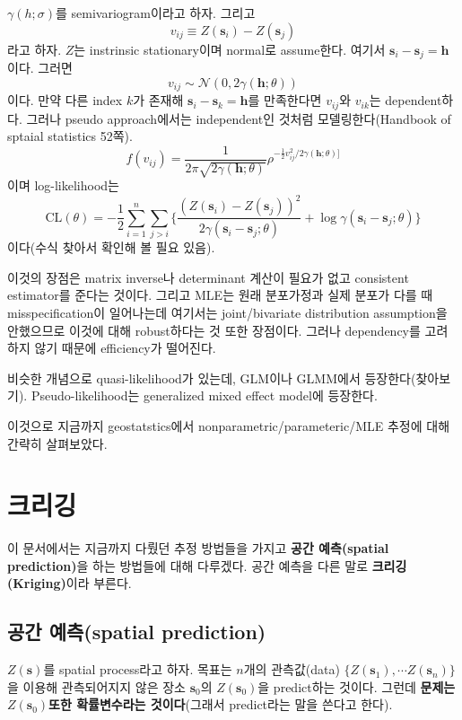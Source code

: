 \documentclass[b5paper,]{scrbook}
\theoremstyle{plain}
\theoremstyle{definition}
\numberwithin{equation}{section}
\begin{document}
\(\gamma(h;\sigma)\)를 semivariogram이라고 하자. 그리고
\[v_{ij}\equiv Z(\mathbf{s}_{i})-Z(\mathbf{s}_{j})\] 라고 하자. \(Z\)는
instrinsic stationary이며 normal로 assume한다. 여기서
\(\mathbf{s}_{i}-\mathbf{s}_{j}=\mathbf{h}\)이다. 그러면
\[v_{ij} \sim \mathcal{N}(0, 2\gamma(\mathbf{h};\theta))\] 이다. 만약
다른 index \(k\)가 존재해 \(\mathbf{s}_{i}-\mathbf{s}_{k}=\mathbf{h}\)를
만족한다면 \(v_{ij}\)와 \(v_{ik}\)는 dependent하다. 그러나 pseudo
approach에서는 independent인 것처럼 모델링한다(Handbook of sptaial
statistics 52쪽).
\[f(v_{ij})=\frac{1}{2\pi\sqrt{2\gamma(\mathbf{h};\theta)}}\rho^{-\frac{1}{2}v_{ij}^{2}/2\gamma(\mathbf{h};\theta)]}\]
이며 log-likelihood는
\[\text{CL}(\theta)=-\frac{1}{2}\sum_{i=1}^{n}\sum_{j>i}\{ \frac{(Z(\mathbf{s}_{i})-Z(\mathbf{s}_{j}))^{2}}{2\gamma(\mathbf{s}_{i}-\mathbf{s}_{j};\theta)}+\log \gamma(\mathbf{s}_{i}-\mathbf{s}_{j};\theta) \}\]
이다(수식 찾아서 확인해 볼 필요 있음).

이것의 장점은 matrix inverse나 determinant 계산이 필요가 없고 consistent
estimator를 준다는 것이다. 그리고 MLE는 원래 분포가정과 실제 분포가 다를
때 misspecification이 일어나는데 여기서는 joint/bivariate distribution
assumption을 안했으므로 이것에 대해 robust하다는 것 또한 장점이다.
그러나 dependency를 고려하지 않기 때문에 efficiency가 떨어진다.

비슷한 개념으로 quasi-likelihood가 있는데, GLM이나 GLMM에서
등장한다(찾아보기). Pseudo-likelihood는 generalized mixed effect model에
등장한다.

이것으로 지금까지 geostatstics에서 nonparametric/parameteric/MLE 추정에
대해 간략히 살펴보았다.

\chapter{크리깅}\label{kriging}

이 문서에서는 지금까지 다뤘던 추정 방법들을 가지고 \textbf{공간
예측(spatial prediction)}을 하는 방법들에 대해 다루겠다. 공간 예측을
다른 말로 \textbf{크리깅(Kriging)}이라 부른다.

\section{공간 예측(spatial prediction)}\label{-spatial-prediction}

\(Z(\mathbf{s})\)를 spatial process라고 하자. 목표는 \(n\)개의
관측값(data) \(\{ Z(\mathbf{s}_{1}), \cdots Z(\mathbf{s}_{n}) \}\)을
이용해 관측되어지지 않은 장소 \(\mathbf{s}_{0}\)의
\(Z(\mathbf{s}_{0})\)을 predict하는 것이다. 그런데 \textbf{문제는
\(Z(\mathbf{s}_{0})\)또한 확률변수라는 것이다}(그래서 predict라는 말을
쓴다고 한다).
\end{document}
